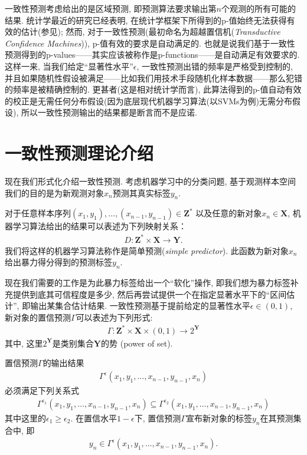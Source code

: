 一致性预测考虑给出的是区域预测, 即预测算法要求输出第$n$个观测的所有可能的结果. 统计学最近的研究已经表明, 在统计学框架下所得到的p-值始终无法获得有效的估计(参见\citep{Ioannidis2005,Taylor2015,Tibshirani2015,Wasserstein2016,Altman2017,Andrade2019,Betensky2019,Lee2019,Ioannidis2019}); 然而, 对于一致性预测(最初命名为\textsf{超越置信机}(\textit{Transductive Confidence Machines})), p-值有效的要求是自动满足的. 也就是说我们基于一致性预测得到的p-values——其实应该被称作是p-functions——是自动满足有效要求的. 这样一来, 当我们给定“显著性水平”$\epsilon$, 一致性预测出错的频率是严格受到控制的, 并且如果随机性假设被满足——比如我们用技术手段随机化样本数据——那么犯错的频率是被精确控制的. 更甚者(这是相对统计学而言), 此算法得到的p-值自动有效的校正是无需任何分布假设(因为底层现代机器学习算法(以SVMs为例)无需分布假设), 所以一致性预测输出的结果都是断言而不是应诺.


\section{一致性预测理论介绍}
现在我们形式化介绍一致性预测. 考虑机器学习中的分类问题, 基于观测样本空间我们的目的是为新观测对象$x_{n}$预测其真实标签$y_{n}$. 

对于任意样本序列$(x_{1}, y_{1}), \ldots, (x_{n-1}, y_{n-1}) \in \mathbf{Z}^{*}$ 以及任意的新对象$x_{n} \in \mathbf{X}$, 机器学习算法给出的结果可以表述为下列映射关系：
\begin{align}
\label{simple-prediction}
D: \mathbf{Z}^{*} \times \mathbf{X} \rightarrow \mathbf{Y}.
\end{align}
我们将这样的机器学习算法称作是\textsf{简单预测}(\textit{simple predictor}). 此函数为新对象$x_{n}$给出暴力得分得到的预测标签$y_{n}$.

现在我们需要的工作是为此暴力标签给出一个“软化”操作, 即我们想为暴力标签补充提供到底其可信程度是多少, 然后再尝试提供一个在指定显著水平下的“区间估计”, 即输出某集合估计结果. 一致性预测基于提前给定的显著性水平$\epsilon \in (0, 1)$, 新对象的\textsf{置信预测}$\Gamma$可以表述为下列形式:
\begin{align}
\label{confidence-predictor}
\Gamma: \mathbf{Z}^{*} \times \mathbf{X} \times (0, 1) \rightarrow 2^{\mathbf{Y}}
\end{align}
其中, 这里$2^{\mathbf{Y}}$是类别集合$\mathbf{Y}$的势 (power of set).

置信预测$\Gamma$的输出结果
\begin{align}
\label{confidence-output}
\Gamma^{\epsilon}(x_{1}, y_{1}, \ldots, x_{n-1}, y_{n-1}, x_{n})
\end{align}
必须满足下列关系式
\begin{align}
\Gamma^{\epsilon_{1}}(x_{1}, y_{1}, \ldots, x_{n-1}, y_{n-1}, x_{n}) \subseteq \Gamma^{\epsilon_{2}}(x_{1}, y_{1}, \ldots, x_{n-1}, y_{n-1}, x_{n})
\end{align}
其中这里的$\epsilon_{1} \geq \epsilon_{2}$. 在置信水平$1 - \epsilon$下, 置信预测$\Gamma$宣布新对象的标签$y_{n}$在其预测集合中, 即
\begin{align}
\label{confidence-y}
y_{n} \in \Gamma^{\epsilon}(x_{1}, y_{1}, \ldots, x_{n-1}, y_{n-1}, x_{n}).
\end{align}


